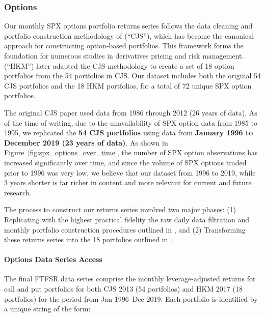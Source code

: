 \documentclass{article}
\begin{document}
\begin{appendices}

\subsubsection{Options}
\label{sec:options}

Our monthly SPX options portfolio returns series follows the data cleaning and portfolio construction methodology of \citet{Constantinides2013} (``CJS''), which has become the canonical approach for constructing option-based portfolios. This framework forms the foundation for numerous studies in derivatives pricing and risk management. \citet{He2017} (``HKM'') later adapted the CJS methodology to create a set of 18 option portfolios from the 54 portfolios in CJS. Our dataset includes both the original 54 CJS portfolios and the 18 HKM portfolios, for a total of 72 unique SPX option portfolios.

The original CJS paper used data from 1986 through 2012 (26 years of data). As of the time of writing, due to the unavailability of SPX option data from 1985 to 1995, we replicated the \textbf{54 CJS portfolios} using data from \textbf{January 1996 to December 2019 (23 years of data)}. As shown in Figure~\ref{fig:spx_options_over_time}, the number of SPX option observations has increased significantly over time, and since the volume of SPX options traded prior to 1996 was very low, we believe that our dataset from 1996 to 2019, while 3 years shorter is far richer in content and more relevant for current and future research.

The process to construct our returns series involved two major phases: (1) Replicating with the highest practical fidelity the raw daily data filtration and monthly portfolio construction procedures outlined in \citet{Constantinides2013}, and (2) Transforming these returns series into the 18 portfolios outlined in \citet{He2017}.

\paragraph{Options Data Series Access}

The final FTFSR data series comprise the monthly leverage-adjusted returns for call and put portfolios for both CJS 2013 (54 portfolios) and HKM 2017 (18 portfolios) for the period from Jan 1996--Dec 2019. Each portfolio is identified by a unique string of the form: 


\end{appendices}
\end{document}
